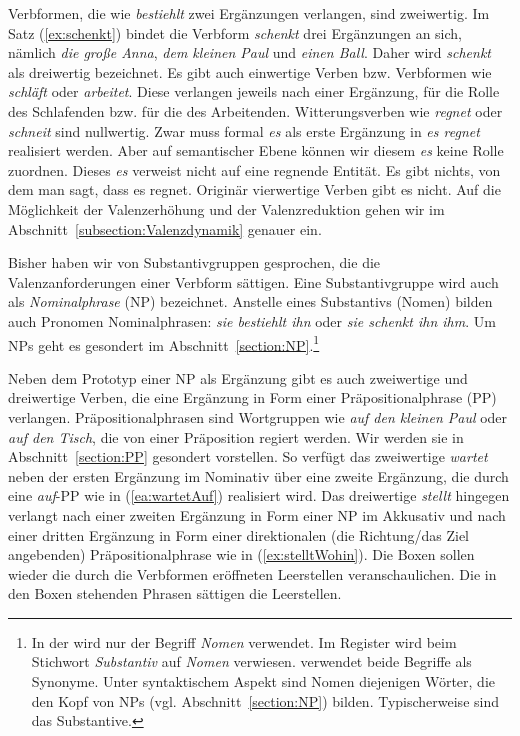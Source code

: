 Verbformen, die wie \textit{bestiehlt} zwei Ergänzungen verlangen, sind zweiwertig. Im Satz (\ref{ex:schenkt}) bindet die Verbform \textit{schenkt} drei Ergänzungen an sich, nämlich \textit{die große Anna}, \textit{dem kleinen Paul} und \textit{einen Ball}. Daher wird \textit{schenkt} als dreiwertig bezeichnet. Es gibt auch einwertige Verben bzw. Verbformen wie \textit{schläft} oder \textit{arbeitet}. Diese verlangen jeweils nach einer Ergänzung, für die Rolle des Schlafenden bzw. für die des Arbeitenden. Witterungsverben wie \textit{regnet} oder \textit{schneit} sind nullwertig. Zwar muss formal \textit{es} als erste Ergänzung in \textit{es regnet} realisiert werden. Aber auf semantischer Ebene können wir diesem \textit{es} keine Rolle zuordnen. Dieses \textit{es} verweist nicht auf eine regnende Entität. Es gibt nichts, von dem man sagt, dass es regnet. Originär vierwertige Verben gibt es nicht. Auf die Möglichkeit der Valenzerhöhung und der Valenzreduktion gehen wir im Abschnitt~\ref{subsection:Valenzdynamik} genauer ein. 

Bisher haben wir von Substantivgruppen gesprochen, die die Valenzanforderungen einer Verbform sättigen. Eine Substantivgruppe wird auch als \textit{Nominalphrase} (NP) bezeichnet. Anstelle eines Substantivs (Nomen) bilden auch Pronomen Nominalphrasen: \textit{sie bestiehlt ihn} oder \textit{sie schenkt ihn ihm}. Um NPs geht es gesondert im Abschnitt~\ref{section:NP}.\footnote{In der \citet{Duden2022} wird nur der Begriff \textit{Nomen} verwendet. Im Register wird beim Stichwort \textit{Substantiv} auf \textit{Nomen} verwiesen. \citet[11]{Eisenberg2020_Satz} verwendet beide Begriffe als Synonyme. Unter syntaktischem Aspekt sind Nomen diejenigen Wörter, die den Kopf von NPs (vgl. Abschnitt~\ref{section:NP}) bilden. Typischerweise sind das Substantive.}

Neben dem Prototyp einer NP als Ergänzung gibt es auch zweiwertige und dreiwertige Verben, die eine Ergänzung in Form einer Präpositionalphrase (PP) verlangen. Präpositionalphrasen sind Wortgruppen wie \textit{auf den kleinen Paul} oder \textit{auf den Tisch}, die von einer Präposition regiert werden. Wir werden sie in Abschnitt~\ref{section:PP} gesondert vorstellen. So verfügt \zB das zweiwertige \textit{wartet} neben der ersten Ergänzung im Nominativ über eine zweite Ergänzung, die durch eine \textit{auf}-PP wie in (\ref{ea:wartetAuf}) realisiert wird. Das dreiwertige \textit{stellt} hingegen verlangt nach einer zweiten Ergänzung in Form einer NP im Akkusativ und nach einer dritten Ergänzung in Form einer direktionalen (die Richtung/das Ziel angebenden) Präpositionalphrase wie in (\ref{ex:stelltWohin}). Die Boxen sollen wieder die durch die Verbformen eröffneten Leerstellen veranschaulichen. Die in den Boxen stehenden Phrasen sättigen die Leerstellen.

